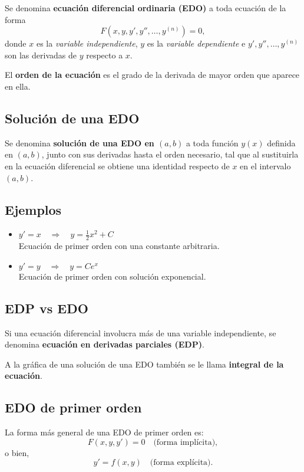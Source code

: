 Se denomina \textbf{ecuación diferencial ordinaria (EDO)} a toda ecuación de la forma
\[
    F\left(x, y, y', y'', \dots, y^{(n)}\right) = 0,
\]
donde $x$ es la \textit{variable independiente}, $y$ es la \textit{variable dependiente} e 
$y', y'', \dots, y^{(n)}$ son las derivadas de $y$ respecto a $x$.  

El \textbf{orden de la ecuación} es el grado de la derivada de mayor orden que aparece en ella.  

\subsection*{Solución de una EDO}
Se denomina \textbf{solución de una EDO en $(a,b)$} a toda función $y(x)$ definida en $(a,b)$, 
junto con sus derivadas hasta el orden necesario, tal que al sustituirla en la ecuación diferencial 
se obtiene una identidad respecto de $x$ en el intervalo $(a,b)$.  

\subsection*{Ejemplos}
\begin{itemize}
    \item $y' = x \quad \Rightarrow \quad y = \tfrac{1}{2}x^2 + C$ \\
    Ecuación de primer orden con una constante arbitraria.
    
    \item $y' = y \quad \Rightarrow \quad y = Ce^{x}$ \\
    Ecuación de primer orden con solución exponencial.
\end{itemize}

\subsection*{EDP vs EDO}
Si una ecuación diferencial involucra más de una variable independiente, se denomina 
\textbf{ecuación en derivadas parciales (EDP)}.  

A la gráfica de una solución de una EDO también se le llama \textbf{integral de la ecuación}.  

\subsection*{EDO de primer orden}
La forma más general de una EDO de primer orden es:
\[
    F(x, y, y') = 0 \quad \text{(forma implícita)},
\]
o bien,
\[
    y' = f(x,y) \quad \text{(forma explícita)}.
\]

